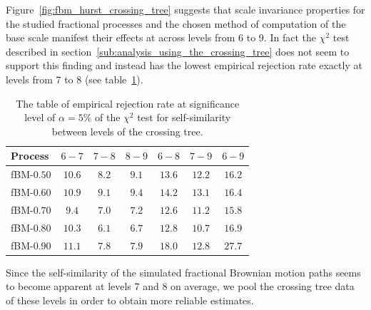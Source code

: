 \documentclass[a4paper]{article}
\begin{document}
Figure~\ref{fig:fbm_hurst_crossing_tree} suggests that scale invariance properties
for the studied fractional processes and the chosen method of computation of the
base scale manifest their effects at across levels from 6 to 9. In fact the $\chi^2$
test described in section~\ref{sub:analysis_using_the_crossing_tree} does not seem
to support this finding and instead has the lowest empirical rejection rate exactly
at levels from 7 to 8 (see table~\ref{tbl:chi_sq_test_for_fbm_only}).
\begin{table}[h]\begin{center}
	\begin{tabular}{l||c|c|c|c|c|c|}
	Process 		&  $6-7$ &          $7-8$ & $8-9$ &  $6-8$ &  $7-9$ &  $6-9$ \\ \hline\hline
	fBM-$0.50$ 		& $10.6$ & $\mathbf{8.2}$ & $9.1$ & $13.6$ & $12.2$ & $16.2$ \\ \hline 
	fBM-$0.60$ 		& $10.9$ & $\mathbf{9.1}$ & $9.4$ & $14.2$ & $13.1$ & $16.4$ \\ \hline 
	fBM-$0.70$ 		&  $9.4$ & $\mathbf{7.0}$ & $7.2$ & $12.6$ & $11.2$ & $15.8$ \\ \hline 
	fBM-$0.80$ 		& $10.3$ & $\mathbf{6.1}$ & $6.7$ & $12.8$ & $10.7$ & $16.9$ \\ \hline 
	fBM-$0.90$ 		& $11.1$ & $\mathbf{7.8}$ & $7.9$ & $18.0$ & $12.8$ & $27.7$ \\ \hline 
 	\end{tabular}
	\caption{The table of empirical rejection rate at significance level of $\alpha = 5\%$
	of the $\chi^2$ test for self-similarity between levels of the crossing tree. }
\label{tbl:chi_sq_test_for_fbm_only}
\end{center}\end{table}
Since the self-similarity of the simulated fractional Brownian motion paths seems
to become apparent at levels 7 and 8 on average, we pool the crossing tree data of
these levels in order to obtain more reliable estimates.
\end{document}
